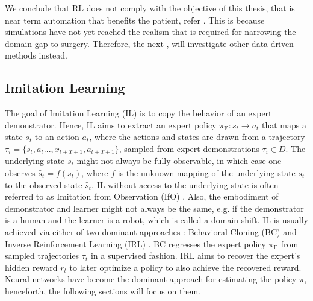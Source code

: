 We conclude that RL does not comply with the objective of this thesis, that is near term automation that benefits the patient, refer . This is because simulations have not yet reached the realism that is required for narrowing the domain gap to surgery. Therefore, the next , will investigate other data-driven methods instead.

\subsection{Imitation Learning}
\label{in:sec:imitation_learning}
The goal of Imitation Learning (IL) is to copy the behavior of an expert demonstrator. Hence, IL aims to extract an expert policy $\pi_\text{E}: s_t \rightarrow a_t$ that maps a state $s_t$ to an action $a_t$, where the actions and states are drawn from a trajectory $\tau_i = \{s_t,a_t...,x_{t+T+1},a_{t+T+1}\}$, sampled from expert demonstrations $\tau_i \in D$. The underlying state $s_t$ might not always be fully observable, in which case one observes $\hat{s}_t = f(s_t)$, where $f$ is the unknown mapping of the underlying state $s_t$ to the observed state $\hat{s}_t$. IL without access to the underlying state is often referred to as Imitation from Observation (IfO) \cite{liu2018imitation}. Also, the embodiment of demonstrator and learner might not always be the same, e.g. if the demonstrator is a human and the learner is a robot, which is called a domain shift. IL is usually achieved via either of two dominant approaches \cite{osa2018algorithmic}: Behavioral Cloning (BC) \cite{pomerleau1991efficient} and Inverse Reinforcement Learning (IRL) \cite{ng2000algorithms}. BC regresses the expert policy $\pi_\text{E}$ from sampled trajectories $\tau_t$ in a supervised fashion. IRL aims to recover the expert's hidden reward $r_t$ to later optimize a policy to also achieve the recovered reward. Neural networks have become the dominant approach for estimating the policy $\pi$, henceforth, the following sections will focus on them.


